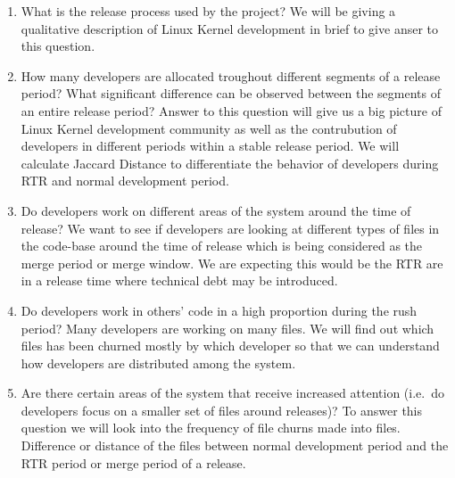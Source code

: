 \documentclass{acm_proc_article-sp}
\begin{document}
\renewcommand{\labelenumi}{Q\theenumi:}
\begin{enumerate}
\item What is the release process used by the project? \newline
We will be giving a qualitative description of Linux Kernel development in brief to give anser to this question.
\item How many developers are allocated troughout different segments of a release period? What significant difference can be observed between the segments of an entire release period? \newline
Answer to this question will give us a big picture of Linux Kernel development community as well as the contrubution of developers in different periods within a stable release period. We will calculate Jaccard Distance to differentiate the behavior of developers during RTR and normal development period.
\item Do developers work on different areas of the system around the time of release? \newline
We want to see if developers are looking at different types of files in the code-base around the time of release which is being considered as the merge period or merge window\cite{linux_kernel}. We are expecting this would be the RTR are in a release time where technical debt may be introduced.
\item Do developers work in others' code in a high proportion during the rush period?
Many developers are working on many files. We will find out which files has been churned mostly by which developer so that we can understand how developers are distributed among the system.
\item Are there certain areas of the system that receive increased attention (i.e.\ do developers focus on a smaller set of files around releases)? \newline
To answer this question we will look into the frequency of file churns made into files. Difference or distance of the files between normal development period and the RTR period or merge period of a release.
\end{enumerate}
\end{document}
